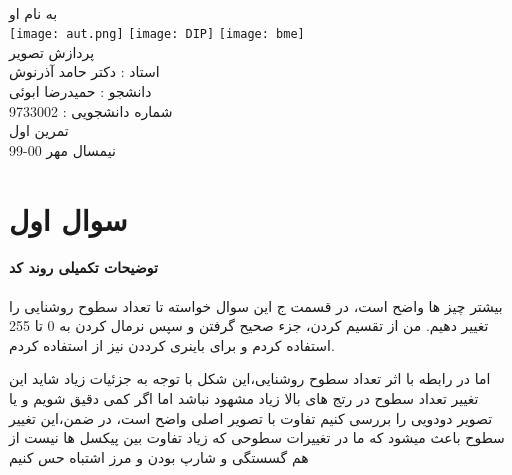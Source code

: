 \documentclass[12pt]{article}
\begin{document}
	\doublespacing
	\begin{titlepage}
		\paragraph*{}
		\centering
			
			
			{\small به نام او}\\
			\vspace{1cm}
			\texttt{[image: aut.png]}
			\hspace{1cm}
			\texttt{[image: DIP]}
			\hspace{1cm}
			\texttt{[image: bme]}\\
			\vspace{2cm}
			{\Huge پردازش تصویر}\\
			\vspace{2cm}
			{\large استاد : دکتر حامد آذرنوش}\\
			\vspace{0.5cm}
			{\small  دانشجو :‌ حمیدرضا ابوئی}\\
			\vspace{0.5cm}
			{\small شماره دانشجویی : 9733002}\\
			\vspace{0.5cm}
			{\small تمرین اول}\\
			\vfill
			{\tiny نیمسال مهر 00-99}
	\end{titlepage}
	\thispagestyle{plain}
	\tableofcontents
	\newpage
	\doublespacing
	\section{سوال اول}
		\paragraph{توضیحات تکمیلی روند کد}
		بیشتر چیز ها واضح است، ‌در قسمت ج این سوال خواسته تا تعداد سطوح روشنایی را تغییر دهیم. من از تقسیم کردن، جزء صحیح گرفتن و سپس نرمال کردن به 0 تا 255 استفاده کردم و برای باینری کرددن نیز از 
		  استفاده کردم.
		  
		اما در رابطه با اثر  تعداد سطوح روشنایی،این شکل با توجه به جزئیات زیاد شاید این تغییر تعداد سطوح در رتج های بالا زیاد مشهود نباشد اما اگر کمی دقیق شویم و یا تصویر دودویی را بررسی کنیم تفاوت با تصویر اصلی واضح است، در ضمن،این تغییر سطوح باعث میشود که ما در تغییرات سطوحی که زیاد تفاوت بین پیکسل ها نیست از هم گسستگی و شارپ بودن و مرز اشتباه حس کنیم
		
\end{document}
